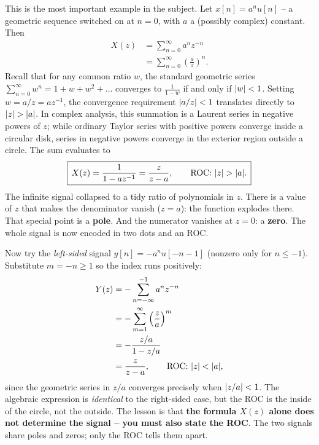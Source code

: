 This is the most important example in the subject. Let $x[n] = a^{n} u[n]$ -- a geometric
sequence switched on at $n=0$, with $a$ a (possibly complex) constant. Then
\begin{align*}
  X(z) &= \sum_{n=0}^{\infty} a^{n} z^{-n} \\
       &= \sum_{n=0}^{\infty} \left(\frac{a}{z}\right)^{n}.
\end{align*}
Recall that for any common ratio $w$, the standard geometric series $\sum_{n=0}^{\infty} w^n = 1 + w + w^2 + \dots$ converges to $\frac{1}{1-w}$ if and only if $\lvert w\rvert < 1$. Setting $w = a/z = a z^{-1}$, the convergence requirement $\lvert a/z\rvert < 1$ translates directly to $\lvert z\rvert > \lvert a\rvert$. In complex analysis, this summation is a Laurent series in negative powers of $z$; while ordinary Taylor series with positive powers converge inside a circular disk, series in negative powers converge in the exterior region outside a circle. The sum evaluates to
\[
  \boxed{\,X(z) = \frac{1}{1 - a z^{-1}} = \frac{z}{z-a}, \qquad \text{ROC: } \lvert z\rvert > \lvert a\rvert.\,}
\]
The infinite signal collapsed to a tidy ratio of polynomials in
$z$. There is a value of $z$ that makes the denominator vanish ($z=a$): the function
explodes there. That special point is a \textbf{pole}. And the numerator vanishes at
$z=0$: a \textbf{zero}. The whole signal is now encoded in two dots and an ROC.

\begin{example}
\label{ch15:ex-roc-matters}
Now try the \emph{left-sided} signal $y[n] = -a^{n}u[-n-1]$ (nonzero only for
$n \le -1$). Substitute $m = -n \ge 1$ so the index runs positively:
\begin{align*}
  Y(z) &= -\sum_{n=-\infty}^{-1} a^n z^{-n} \\
       &= -\sum_{m=1}^{\infty} \left(\frac{z}{a}\right)^m \\
       &= -\frac{z/a}{1 - z/a} \\
       &= \frac{z}{z-a}, \qquad \text{ROC: } \lvert z\rvert < \lvert a\rvert,
\end{align*}
since the geometric series in $z/a$ converges precisely when $\lvert z/a\rvert < 1$.
The algebraic expression is \emph{identical} to the right-sided case, but the ROC is the
inside of the circle, not the outside. The lesson is that \textbf{the formula
$X(z)$ alone does not determine the signal -- you must also state the ROC}. The two signals
share poles and zeros; only the ROC tells them apart.
\end{example}


